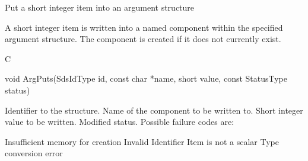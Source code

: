 \begin{manroutinedescription}
      Put a short integer item into an argument structure

      A short integer item is written into a named component within the
      specified argument structure. The component is created if it
      does not currently exist.
 
      C

      void ArgPuts(SdsIdType id, const char *name, short value, const %
StatusType {\mantt{*}} status)
 
\begin{manparametertable}
 Identifier to the structure.
 Name of the component to be %
written to.
 Short integer value to be written.
 Modified status. Possible %
failure codes are:
\end{manparametertable}
\begin{mantwocolumntable}
Insufficient memory for creation
Invalid Identifier
Item is not a scalar
Type conversion error
\end{mantwocolumntable}
\end{manroutinedescription}
